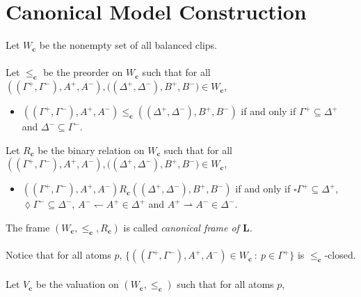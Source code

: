 \documentclass[draft]{article}
\def\L{\mathbf{L}}
\begin{document}
\section{Canonical Model Construction}\label{section:canonical:model:construction}
%
%
Let $W_{\mathbf{c}}$ be the nonempty set of all balanced clips.
%
%
\\
\\
%
%
Let $\leq_{\mathbf{c}}$ be the preorder on $W_{\mathbf{c}}$ such that for all $((\Gamma^{+},\Gamma^{-}),A^{+},A^{-}),((\Delta^{+},\Delta^{-}),B^{+},
%
%
%
%
%
%
%
$\linebreak$
%
%
%
%
%
%
B^{-}){\in}W_{\mathbf{c}}$,
%
%
\begin{itemize}
%
%
\item $((\Gamma^{+},\Gamma^{-}),A^{+},A^{-}){\leq_{\mathbf{c}}}((\Delta^{+},\Delta^{-}),B^{+},B^{-})$ if and only if $\Gamma^{+}{\subseteq}\Delta^{+}$ and $\Delta^{-}{\subseteq}
%
%
%
%
%
%
%
$\linebreak$
%
%
%
%
%
%
\Gamma^{-}$.
%
%
\end{itemize}
%
%
Let $R_{\mathbf{c}}$ be the binary relation on $W_{\mathbf{c}}$ such that for all $((\Gamma^{+},\Gamma^{-}),A^{+},A^{-}),((\Delta^{+},\Delta^{-}),
%
%
%
%
%
%
%
$\linebreak$
%
%
%
%
%
%
B^{+},B^{-}){\in}W_{\mathbf{c}}$,
%
%
\begin{itemize}
%
%
\item $((\Gamma^{+},\Gamma^{-}),A^{+},A^{-}){R_{\mathbf{c}}}((\Delta^{+},\Delta^{-}),B^{+},B^{-})$ if and only if ${\square}\Gamma^{+}{\subseteq}\Delta^{+}$, ${\lozenge}\Gamma^{-}{\subseteq}
%
%
%
%
%
%
%
$\linebreak$
%
%
%
%
%
%
\Delta^{-}$, $A^{-}{\leftharpoondown}A^{+}{\in}\Delta^{+}$ and $A^{+}{\rightharpoonup}A^{-}{\in}\Delta^{-}$.
%
%
\end{itemize}
%
%
The frame $(W_{\mathbf{c}},{\leq_{\mathbf{c}}},{R_{\mathbf{c}}})$ is called {\em canonical frame of $\L$.}
%
%
\\
\\
%
%
Notice that for all atoms $p$, $\{((\Gamma^{+},\Gamma^{-}),A^{+},A^{-}){\in}W_{\mathbf{c}}\ :\ p{\in}\Gamma^{+}\}$ is $\leq_{\mathbf{c}}$-closed.
%
%
\\
\\
%
%
Let $V_{\mathbf{c}}$ be the valuation on $(W_{\mathbf{c}},{\leq_{\mathbf{c}}})$ such that for all atoms $p$,
\end{document}
